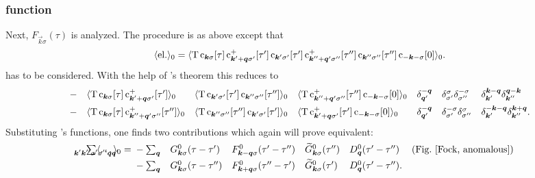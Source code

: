 \subsubsection{ function}

Next, $F_{\vec k \sigma}(\tau)$ is analyzed. The procedure is as above except
that
%
\begin{align*}
    \av{\text{el.}}_0= \av{\op T \,
        \op c_{\vec k \sigma}[\tau] \,
        \op c_{\vec k' + \vec q \sigma'}^+[\tau'] \,
        \op c_{\vec k' \sigma'}[\tau'] \,
        \op c_{\vec k'' + \vec q' \sigma''}^+[\tau''] \,
        \op c_{\vec k'' \sigma''}[\tau''] \,
        \op c_{-\vec k -\sigma}[0]}_0.
\end{align*}
%
has to be considered. With the help of 's theorem this reduces to
%
\begingroup
    \def\minalignsep{0pt}
    \begin{align*}
        &-
        && \av{\op T \, \op c_{\vec k \sigma}[\tau]
        \, \op c_{\vec k' + \vec q \sigma'}^+[\tau']}_0
        && \av{\op T \, \op c_{\vec k' \sigma'}[\tau']
        \, \op c_{\vec k'' \sigma''}[\tau'']}_0
        && \av{\op T \, \op c_{\vec k'' + \vec q' \sigma''}^+[\tau'']
        \, \op c_{-\vec k -\sigma}[0]}_0
        && \delta_{\vec q'}^{-\vec q}
        && \delta_{\sigma'}^\sigma \delta_{\sigma''}^{-\sigma}
        && \delta_{\vec k'}^{\vec k - \vec q}
           \delta_{\vec k''}^{\vec q - \vec k} \\
        &-
        && \av{\op T \, \op c_{\vec k \sigma}[\tau]
        \, \op c_{\vec k'' + \vec q' \sigma''}^+[\tau'']}_0
        && \av{\op T \, \op c_{\vec k'' \sigma''}[\tau'']
        \, \op c_{\vec k' \sigma'}[\tau']}_0
        && \av{\op T \, \op c_{\vec k' + \vec q \sigma'}^+[\tau']
        \, \op c_{-\vec k -\sigma}[0]}_0
        && \delta_{\vec q'}^{-\vec q}
        && \delta_{\sigma'}^{-\sigma} \delta_{\sigma''}^\sigma
        && \delta_{\vec k'}^{-\vec k - \vec q}
           \delta_{\vec k''}^{\vec k + \vec q}.
    \end{align*}
\endgroup
%
Substituting 's functions, one finds two contributions which again
will prove equivalent:
%
\begin{align*}
    \sum_{\mathclap{\vec k' \vec k'' \sigma' \sigma'' \vec q \vec q'}}
    \av \dots_0 =
    \let\displaystyle\textstyle
    \begin{aligned}[t]
        &- \sum_{\vec q}
        && G^0_{\vec k \sigma}(\tau - \tau')
        && F^0_{\vec k - \vec q \sigma}(\tau' - \tau'')
        && \smash{\widetilde G^0_{\vec k \sigma}}(\tau'')
        && D^0_{\vec q}(\tau' - \tau'')
        &  \text{(Fig.~\ref{Fock, anomalous})} \\
        &- \sum_{\vec q}
        && G^0_{\vec k \sigma}(\tau - \tau'')
        && F^0_{\vec k + \vec q \sigma}(\tau'' - \tau')
        && \smash{\widetilde G^0_{\vec k \sigma}}(\tau')
        && D^0_{\vec q}(\tau' - \tau'').
        &
    \end{aligned}
\end{align*}
